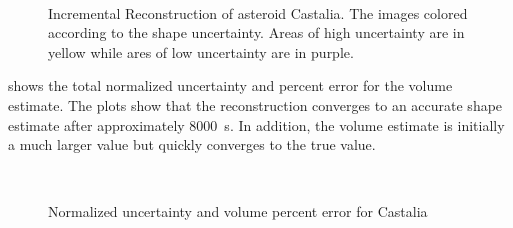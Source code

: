 \begin{figure}[htbp]
    ~
    \caption[Asteroid Castalia Shape Reconstruction with Uncertainty]{Incremental Reconstruction of asteroid Castalia. The images colored according to the shape uncertainty. Areas of high uncertainty are in yellow while ares of low uncertainty are in purple.~\label{fig:castalia_weights_reconstruction}}
\end{figure}

 shows the total normalized uncertainty and percent error for the volume estimate. 
The plots show that the reconstruction converges to an accurate shape estimate after approximately \SI{8000}{\second}.
In addition, the volume estimate is initially a much larger value but quickly converges to the true value.
\begin{figure}[htbp]
    \centering
    ~
    \caption{Normalized uncertainty and volume percent error for Castalia\label{fig:castalia_metrics}}
\end{figure}

